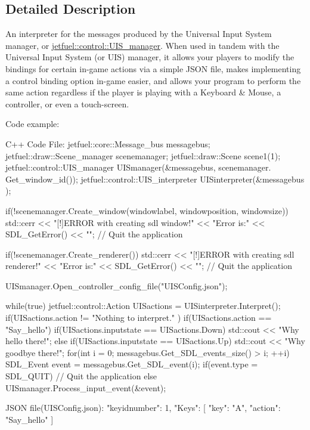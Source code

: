 \subsection{Detailed Description}
An interpreter for the messages produced by the Universal Input System manager, or \hyperlink{classjetfuel_1_1control_1_1UIS__manager}{jetfuel\+::control\+::\+U\+I\+S\+\_\+manager}. When used in tandem with the Universal Input System (or U\+IS) manager, it allows your players to modify the bindings for certain in-\/game actions via a simple J\+S\+ON file, makes implementing a control binding option in-\/game easier, and allows your program to perform the same action regardless if the player is playing with a Keyboard \& Mouse, a controller, or even a touch-\/screen.

Code example\+: \begin{DoxyVerb}C++ Code File:
       jetfuel::core::Message_bus messagebus;
       jetfuel::draw::Scene_manager scenemanager;
       jetfuel::draw::Scene scene1(1);
       jetfuel::control::UIS_manager UISmanager(&messagebus,
                                             scenemanager.
                                             Get_window_id());
       jetfuel::control::UIS_interpreter UISinterpreter(&messagebus
                                                              );

       if(!scenemanager.Create_window(windowlabel,
                                      windowposition,
                                      windowsize)){
            std::cerr << "[!]ERROR with creating sdl window!"
            << "Error is:" << SDL_GetError() << "\n";
            // Quit the application
       }

       if(!scenemanager.Create_renderer()){
            std::cerr << "[!]ERROR with creating sdl renderer!"
            << "Error is:" << SDL_GetError() << "\n";
            // Quit the application
       }

       UISmanager.Open_controller_config_file("UISConfig.json");

       while(true){
           jetfuel::control::Action UISactions =
           UISinterpreter.Interpret();
           if(UISactions.action != "Nothing to interpret."
              ){
                   if(UISactions.action == "Say_hello"){
                       if(UISactions.inputstate ==
                         UISactions.Down){
                          std::cout << "Why hello there!\n";
                       }else if(UISactions.inputstate ==
                                UISactions.Up){
                           std::cout
                           << "Why goodbye there!\n";
                       }
                   }
               }
       }
       for(int i = 0; messagebus.Get_SDL_events_size() > i; ++i){
           SDL_Event event = messagebus.Get_SDL_event(i);
           if(event.type = SDL_QUIT){
               // Quit the application
           }else{
               UISmanager.Process_input_event(&event);
           }
       }

JSON file(UISConfig.json):
    {
        "keyidnumber": 1,
        "Keys": [
          {
            "key": "A",
            "action": "Say_hello"
          }
        ]
    }  \end{DoxyVerb}
 

